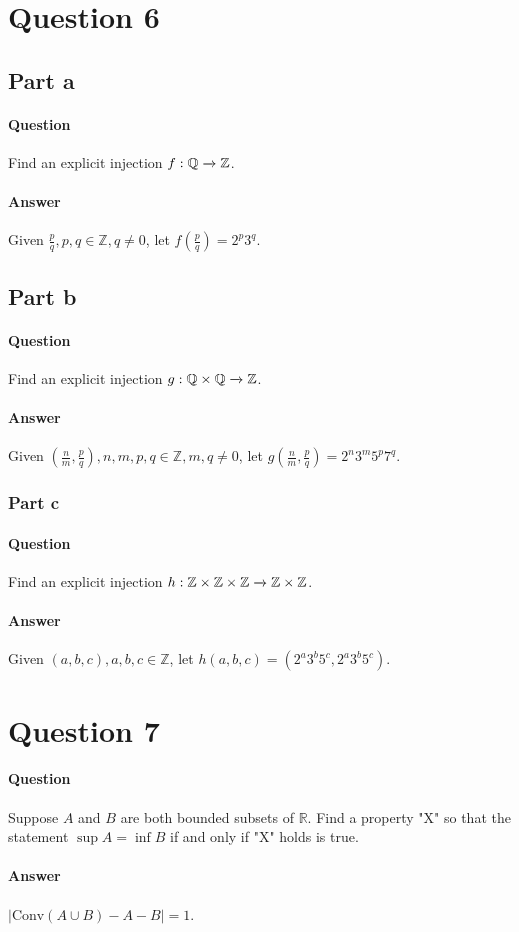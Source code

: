 \documentclass{article}
\begin{document}
\section{Question 6}
\subsection{Part a}
\paragraph{Question}Find an explicit injection $f: \mathbb{Q}\xrightarrow{}\mathbb{Z}$.
\paragraph{Answer}Given $\frac{p}{q}, p,q \in \mathbb{Z}, q \neq 0$, let $f(\frac{p}{q})=2^p3^q$.
\subsection{Part b}
\paragraph{Question}Find an explicit injection $g: \mathbb{Q \times Q}\xrightarrow{}\mathbb{Z}$.
\paragraph{Answer}Given $(\frac{n}{m},\frac{p}{q}), n,m,p,q \in \mathbb{Z}, m,q \neq 0$, let $g(\frac{n}{m},\frac{p}{q}) = 2^n3^m5^p7^q$.
\subsubsection{Part c}
\paragraph{Question}Find an explicit injection $h: \mathbb{Z\times Z\times Z}\xrightarrow{}\mathbb{Z\times Z}$.
\paragraph{Answer}Given $(a,b,c), a,b,c \in \mathbb{Z}$, let $h(a,b,c)=(2^a3^b5^c,2^a3^b5^c)$.
\pagebreak
\section{Question 7}
\paragraph{Question} Suppose $A$ and $B$ are both bounded subsets of $\mathbb{R}$. Find a property "X" so that the statement $\sup{A} = \inf{B}$ if and only if "X" holds is true.
\paragraph{Answer} $|\textrm{Conv}(A\cup B)-A-B|=1$.
\end{document}
